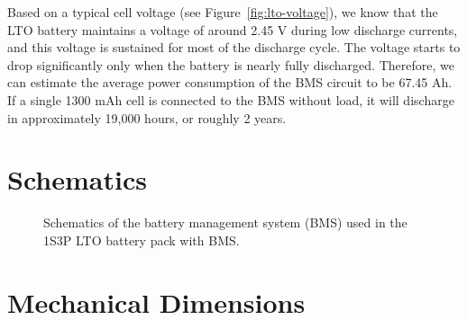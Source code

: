 \documentclass[11pt]{datasheet}
\begin{document}
Based on a typical cell voltage (see Figure~\ref{fig:lto-voltage}), we know that
the LTO battery maintains a voltage of around 2.45 V during low discharge
currents, and this voltage is sustained for most of the discharge cycle. The
voltage starts to drop significantly only when the battery is nearly fully
discharged. Therefore, we can estimate the average power consumption of the BMS
circuit to be 67.45 \textmu{}Ah. If a single 1300 mAh cell is connected to the
BMS without load, it will discharge in approximately 19,000 hours, or roughly 2
years.

\clearpage
\section{Schematics}

\begin{figure}[!ht]
    \centering
    \caption{Schematics of the battery management system (BMS) used in the 1S3P LTO battery pack with BMS.}
\end{figure}

\clearpage
\section{Mechanical Dimensions}
\end{document}
